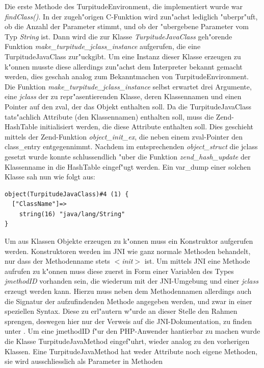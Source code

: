Die erste Methode des TurpitudeEnvironment, die implementiert wurde war \emph{findClass()}. In der zugeh"origen C-Funktion wird zun"achst 
lediglich "uberpr"uft, ob die Anzahl der Parameter stimmt, und ob der "ubergebene Parameter vom Typ \emph{String} ist. Dann wird die
zur Klasse \emph{TurpitudeJavaClass} geh"orende Funktion \emph{make\_turpitude\_jclass\_instance} aufgerufen, die eine TurpitudeJavaClass
zur"uckgibt. Um eine Instanz dieser
Klasse erzeugen zu k"onnen musste diese allerdings zun"achst dem Interpreter bekannt gemacht werden, dies geschah analog zum Bekanntmachen
von TurpitudeEnvironment. Die Funktion \emph{make\_turpitude\_jclass\_instance} selbst erwartet drei Argumente, eine \emph{jclass} der zu
repr"asentierenden Klasse, deren Klassennamen und einen Pointer auf den zval, der das Objekt enthalten soll. Da die TurpitudeJavaClass 
tats"achlich Attribute (den Klassennamen) enthalten soll, muss die Zend-HashTable initialisiert werden, die diese Attribute enthalten soll.
Dies geschieht mittels der Zend-Funktion \emph{object\_init\_ex}, die neben einem zval-Pointer den class\_entry entgegennimmt.
Nachdem im entsprechenden \emph{object\_struct} die jclass gesetzt wurde konnte schlussendlich "uber die Funktion \emph{zend\_hash\_update} 
der Klassenname in die HashTable eingef"ugt werden. Ein var\_dump einer solchen Klasse sah nun wie folgt aus:
\begin{lstlisting}[caption=Dump einer TurpitudeJavaClass]
object(TurpitudeJavaClass)#4 (1) {
  ["ClassName"]=>
    string(16) "java/lang/String"
}
\end{lstlisting}
Um aus Klassen Objekte erzeugen zu k"onnen muss ein Konstruktor aufgerufen werden. Konstruktoren werden im JNI wie ganz normale Methoden
behandelt, nur dass der Methodenname stets \emph{$<$init$>$} ist. Um mittels JNI eine Methode aufrufen zu k"onnen muss diese zuerst in
Form einer Variablen des Types \emph{jmethodID} vorhanden sein, die wiederum mit der JNI-Umgebung und einer \emph{jclass} erzeugt werden kann.
Hierzu muss neben dem Methodennamen allerdings auch die Signatur der aufzufindenden Methode angegeben werden, und zwar in einer speziellen
Syntax. Diese zu erl"autern w"urde an dieser Stelle den Rahmen sprengen, deswegen hier nur der Verweis auf die JNI-Dokumentation, zu finden
unter \cite{JNIHP}.
Um eine jmethodID f"ur den PHP-Anwender hantierbar zu machen wurde die Klasse TurpitudeJavaMethod eingef"uhrt, wieder analog zu den
vorherigen Klassen. Eine TurpitudeJavaMethod hat weder Attribute noch eigene Methoden, sie wird ausschliesslich als Parameter in Methoden

